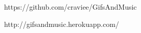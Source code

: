 \begin{thebibliography}{99} %

https://github.com/craviee/GifsAndMusic

http://gifsandmusic.herokuapp.com/
 
\end{thebibliography}